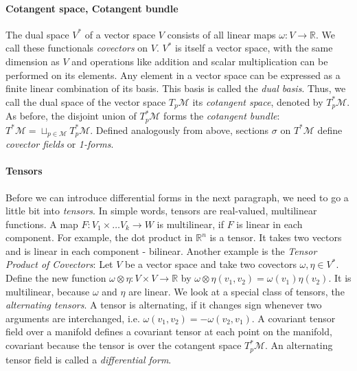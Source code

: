 \documentclass[../thesis.tex]{subfiles}
\begin{document}
\paragraph{Cotangent space, Cotangent bundle} The dual space $V^*$ of a vector space $V$
consists of all linear maps $\omega: V \to \mathbb{R}$. We call these functionals \emph{covectors} on $V$.
$V^*$ is itself a vector space, with the same dimension as $V$ and operations like addition and scalar multiplication
can be performed on its elements. Any element in a vector space can be expressed as 
a finite linear combination of its basis. This basis is called the \emph{dual basis}.
Thus, we call the dual space of the vector space $T_p\mathcal{M}$ its \emph{cotangent space},
denoted by $T^*_p\mathcal{M}$. As before, the disjoint union of $T^*_p\mathcal{M}$ forms the \emph{cotangent bundle}:
$T^*\mathcal{M}=\sqcup _{p\in \mathcal{M}}T^*_p\mathcal{M}$. Defined analogously from above,
sections $\sigma$ on $T^*\mathcal{M}$ define \emph{covector fields} or \emph{1-forms}.

\paragraph{Tensors}
Before we can introduce differential forms in the next paragraph, we need to go a little bit into \emph{tensors}.
In simple words, tensors are real-valued, multilinear functions.
A map $F: V_1 \times \dots V_k \to W$ is multilinear, if $F$ is linear in each component.
For example, the dot product in $\mathbb{R}^n$ is a tensor. It takes two vectors and is linear in each component - bilinear.
Another example is the \emph{Tensor Product of Covectors}:
Let $V$ be a vector space and take two covectors $\omega, \eta \in V^*$.
Define the new function $\omega \otimes \eta: V\times V \to \mathbb{R}$ by
$\omega \otimes \eta (v_1,v_2) = \omega(v_1)\eta(v_2)$. It is multilinear, because $\omega$ and $\eta$ are linear.
We look at a special class of tensors, the \emph{alternating tensors}.
A tensor is alternating, if it changes sign whenever two arguments are interchanged,
i.e. $\omega(v_1, v_2) = -\omega(v_2, v_1)$.
A covariant tensor field over a manifold defines a covariant tensor at each point on the manifold,
covariant because the tensor is over the cotangent space $T^*_p\mathcal{M}$.
An alternating tensor field is called a \emph{differential form}.
\end{document}
